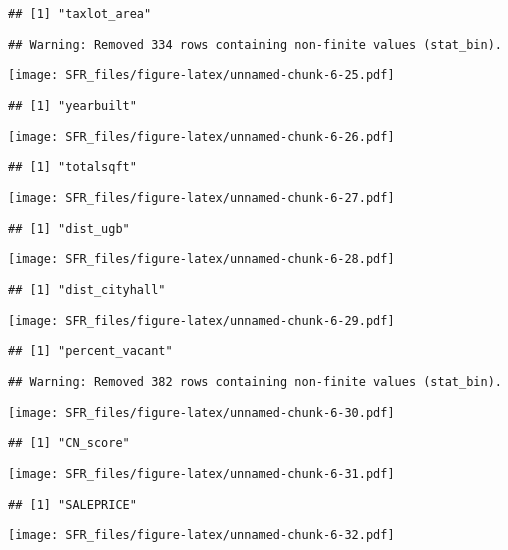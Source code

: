 \documentclass[]{article}
\begin{document}
\begin{verbatim}
## [1] "taxlot_area"
\end{verbatim}

\begin{verbatim}
## Warning: Removed 334 rows containing non-finite values (stat_bin).
\end{verbatim}

\texttt{[image: SFR\_files/figure-latex/unnamed-chunk-6-25.pdf]}

\begin{verbatim}
## [1] "yearbuilt"
\end{verbatim}

\texttt{[image: SFR\_files/figure-latex/unnamed-chunk-6-26.pdf]}

\begin{verbatim}
## [1] "totalsqft"
\end{verbatim}

\texttt{[image: SFR\_files/figure-latex/unnamed-chunk-6-27.pdf]}

\begin{verbatim}
## [1] "dist_ugb"
\end{verbatim}

\texttt{[image: SFR\_files/figure-latex/unnamed-chunk-6-28.pdf]}

\begin{verbatim}
## [1] "dist_cityhall"
\end{verbatim}

\texttt{[image: SFR\_files/figure-latex/unnamed-chunk-6-29.pdf]}

\begin{verbatim}
## [1] "percent_vacant"
\end{verbatim}

\begin{verbatim}
## Warning: Removed 382 rows containing non-finite values (stat_bin).
\end{verbatim}

\texttt{[image: SFR\_files/figure-latex/unnamed-chunk-6-30.pdf]}

\begin{verbatim}
## [1] "CN_score"
\end{verbatim}

\texttt{[image: SFR\_files/figure-latex/unnamed-chunk-6-31.pdf]}

\begin{verbatim}
## [1] "SALEPRICE"
\end{verbatim}

\texttt{[image: SFR\_files/figure-latex/unnamed-chunk-6-32.pdf]}
\end{document}
